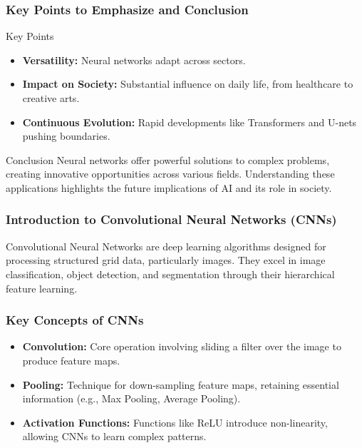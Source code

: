 \documentclass[aspectratio=169]{beamer}
\begin{document}
\begin{frame}[fragile]
    \frametitle{Key Points to Emphasize and Conclusion}

    \begin{block}{Key Points}
        \begin{itemize}
            \item \textbf{Versatility:} Neural networks adapt across sectors.
            \item \textbf{Impact on Society:} Substantial influence on daily life, from healthcare to creative arts.
            \item \textbf{Continuous Evolution:} Rapid developments like Transformers and U-nets pushing boundaries.
        \end{itemize}
    \end{block}

    \begin{block}{Conclusion}
        Neural networks offer powerful solutions to complex problems, creating innovative opportunities across various fields.
        Understanding these applications highlights the future implications of AI and its role in society.
    \end{block}
\end{frame}

\begin{frame}
    \frametitle{Introduction to Convolutional Neural Networks (CNNs)}
    Convolutional Neural Networks are deep learning algorithms designed for processing structured grid data, particularly images. They excel in image classification, object detection, and segmentation through their hierarchical feature learning.
\end{frame}

\begin{frame}
    \frametitle{Key Concepts of CNNs}
    \begin{itemize}
        \item \textbf{Convolution:} Core operation involving sliding a filter over the image to produce feature maps.
        \item \textbf{Pooling:} Technique for down-sampling feature maps, retaining essential information (e.g., Max Pooling, Average Pooling).
        \item \textbf{Activation Functions:} Functions like ReLU introduce non-linearity, allowing CNNs to learn complex patterns.
    \end{itemize}
\end{frame}
\end{document}
